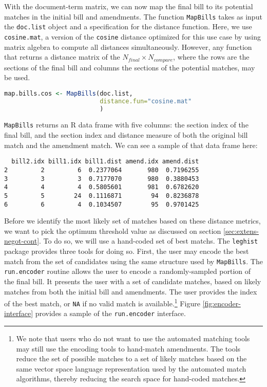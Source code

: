 \documentclass[11pt]{article}
\begin{document}
With the document-term matrix, we can now map the final bill to its
potential matches in the initial bill and amendments. The function
\texttt{MapBills} takes as input the \texttt{doc.list} object and a
specification for the distance function. Here, we use
\texttt{cosine.mat}, a version of the \texttt{cosine} distance
optimized for this use case by using matrix algebra to compute all
distances simultaneously. However, any function that returns a
distance matrix of the $N_{final} \times N_{compare}$, where the rows
are the sections of the final bill and columns the sections of the
potential matches, may be used. 

\begin{lstlisting}[language=R, numbers=none]
map.bills.cos <- MapBills(doc.list,
                          distance.fun="cosine.mat"
                          )
\end{lstlisting}

\texttt{MapBills} returns an R data frame with five columns: the
section index of the final bill, and the section index and distance
measure of both the original bill match and the amendment match. We
can see a sample of that data frame here:

\begin{verbatim}
  bill2.idx bill1.idx bill1.dist amend.idx amend.dist
2         2         6  0.2377064       980  0.7196255
3         3         3  0.7177070       980  0.3880453
4         4         4  0.5805601       981  0.6782620
5         5        24  0.1116871        94  0.8236878
6         6         4  0.1034507        95  0.9701425
\end{verbatim}

Before we identify the most likely set of matches based on these
distance metrics, we want to pick the optimum threshold value as
discussed on section \ref{sec:extens-negot-cont}. To do so, we will
use a hand-coded set of best matchs. The \texttt{leghist} package
provides three tools for doing so. First, the user may encode the best
match from the set of candidates using the same structure used by
\texttt{MapBills}. The \texttt{run.encoder} routine allows the user to
encode a randomly-sampled portion of the final bill. It presents the
user with a set of candidate matches, based on likely matches from
both the initial bill and amendments. The user provides the index of
the best match, or \texttt{NA} if no valid match is
available.\footnote{We note that users who do not want to use the
  automated matching tools may still use the encoding tools to
  hand-match amendments. The tools reduce the set of possible matches
  to a set of likely matches based on the same vector space language
  representation used by the automated match algorithms, thereby
  reducing the search space for hand-coded matches.} Figure
\ref{fig:encoder-interface} provides a sample of the 
\texttt{run.encoder} interface.
\end{document}
